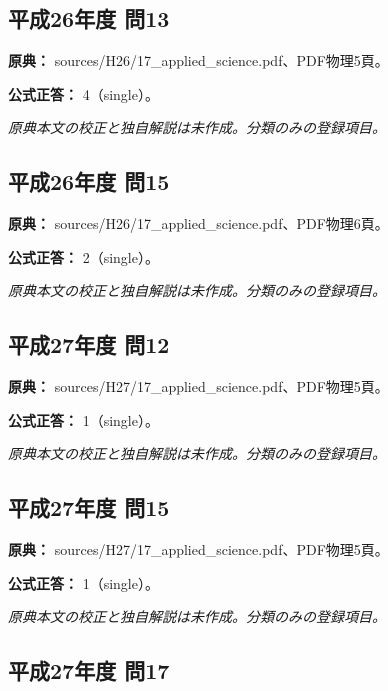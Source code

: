 \subsection{平成26年度 問13}
\label{q:h26-reg-applied-13}

\noindent\textbf{原典：} sources/H26/17\_applied\_science.pdf、PDF物理5頁。

\textbf{公式正答：} 4（single）。

\par\textit{原典本文の校正と独自解説は未作成。分類のみの登録項目。}

\subsection{平成26年度 問15}
\label{q:h26-reg-applied-15}

\noindent\textbf{原典：} sources/H26/17\_applied\_science.pdf、PDF物理6頁。

\textbf{公式正答：} 2（single）。

\par\textit{原典本文の校正と独自解説は未作成。分類のみの登録項目。}

\subsection{平成27年度 問12}
\label{q:h27-reg-applied-12}

\noindent\textbf{原典：} sources/H27/17\_applied\_science.pdf、PDF物理5頁。

\textbf{公式正答：} 1（single）。

\par\textit{原典本文の校正と独自解説は未作成。分類のみの登録項目。}

\subsection{平成27年度 問15}
\label{q:h27-reg-applied-15}

\noindent\textbf{原典：} sources/H27/17\_applied\_science.pdf、PDF物理5頁。

\textbf{公式正答：} 1（single）。

\par\textit{原典本文の校正と独自解説は未作成。分類のみの登録項目。}

\subsection{平成27年度 問17}
\label{q:h27-reg-applied-17}

